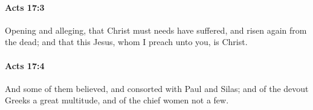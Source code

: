 		\paragraph{Acts 17:3} %
			\label{ACTS-17-3}

			Opening and alleging, that Christ must needs have suffered, and risen again from the dead; and that this Jesus, whom I preach unto you, is Christ.

			\begin{framed}
			\scriptsize
				\begin{compactdesc}
					\item[SBLG] 
				\end{compactdesc}
			\end{framed}

		\paragraph{Acts 17:4} %
			\label{ACTS-17-4}

			And some of them believed, and consorted with Paul and Silas; and of the devout Greeks a great multitude, and of the chief women not a few.

